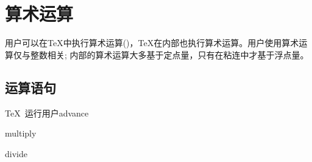 \documentclass{book}
\begin{document}
\section{算术运算}


用户可以在\TeX 中执行算术运算()，\TeX 在内部也执行算术运算。用户使用算术运算仅与整数相关; 内部的算术运算大多基于定点量，只有在粘连中才基于浮点量。


\subsection{运算语句}


\TeX\ 运行用户\cstoidx advance\par\cstoidx multiply\par\cstoidx divide\par
\end{document}
